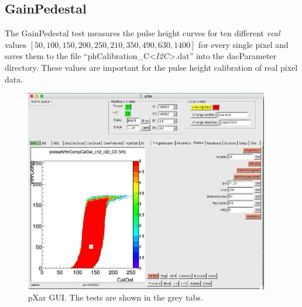 \documentclass[british,11pt,a4paper]{memoir}
\begin{document}
\subsection{GainPedestal}\label{sgainped}
The GainPedestal test measures the pulse height curves for ten different \textit{vcal} values $[50, 100, 150, 200, 250, 210, 350, 490, 630, 1400]$ for every single pixel and saves them to the file ``phCalibration\_C<\textit{\ac{I2C}}>.dat'' into the dacParameter directory. These values are important for the pulse height calibration of real pixel data.
\begin{figure}[ht]
	\centering
	\includegraphics[width=0.95\textwidth]{gui}
	\caption{pXar \ac{GUI}. The tests are shown in the grey tabs.}
	\label{pgui}
\end{figure}\no
\end{document}
